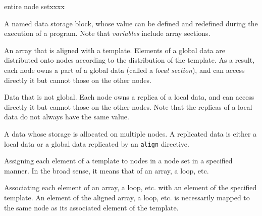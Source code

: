 \begin{namelist}{entire node setxxxx}


 A named data storage block, whose value can be defined and redefined
 during the execution of a program. Note that {\it variables} include
 array sections.


 An array that is aligned with a template. Elements of a global data are
 distributed onto nodes according to the distribution of the
 template. As a result, each node owns a part of a global data (called a
 {\it local section}), and can access directly it but cannot those on
 the other nodes.



 Data that is not global. Each node owns a replica of a local data,
 and can access directly it but cannot those on the other nodes. Note
 that the replicas of a local data do not always have the same value.



 A data whose storage is allocated on multiple nodes. A replicated data
 is either a local data or a global data replicated by an {\tt align}
 directive.


 Assigning each element of a template to nodes in a node set in a
 specified manner. In the broad sense, it means that of an array, a
 loop, etc.



 Associating each element of an array, a loop, etc. with an element of
 the specified template. An element of the aligned array, a loop,
 etc. is necessarily mapped to the same node as its associated element
 of the template.



\end{namelist}
